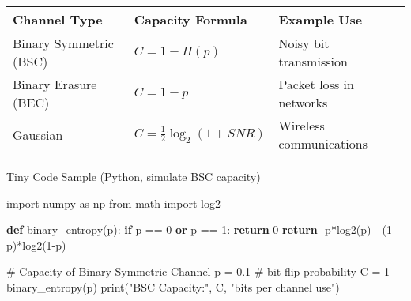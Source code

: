 \documentclass[
  letterpaper,
  DIV=11,
  numbers=noendperiod]{scrreprt}
\newenvironment{Shaded}{\begin{snugshade}}{\end{snugshade}}
\newcommand{\BuiltInTok}[1]{\textcolor[rgb]{0.00,0.23,0.31}{#1}}
\newcommand{\CommentTok}[1]{\textcolor[rgb]{0.37,0.37,0.37}{#1}}
\newcommand{\ControlFlowTok}[1]{\textcolor[rgb]{0.00,0.23,0.31}{\textbf{#1}}}
\newcommand{\DecValTok}[1]{\textcolor[rgb]{0.68,0.00,0.00}{#1}}
\newcommand{\FloatTok}[1]{\textcolor[rgb]{0.68,0.00,0.00}{#1}}
\newcommand{\ImportTok}[1]{\textcolor[rgb]{0.00,0.46,0.62}{#1}}
\newcommand{\KeywordTok}[1]{\textcolor[rgb]{0.00,0.23,0.31}{\textbf{#1}}}
\newcommand{\NormalTok}[1]{\textcolor[rgb]{0.00,0.23,0.31}{#1}}
\newcommand{\OperatorTok}[1]{\textcolor[rgb]{0.37,0.37,0.37}{#1}}
\newcommand{\StringTok}[1]{\textcolor[rgb]{0.13,0.47,0.30}{#1}}
\begin{document}
\begin{longtable}[]{@{}
  >{\raggedright\arraybackslash}p{}
  >{\raggedright\arraybackslash}p{}
  >{\raggedright\arraybackslash}p{}@{}}
\toprule\noalign{}
\begin{minipage}[b]{\linewidth}\raggedright
Channel Type
\end{minipage} & \begin{minipage}[b]{\linewidth}\raggedright
Capacity Formula
\end{minipage} & \begin{minipage}[b]{\linewidth}\raggedright
Example Use
\end{minipage} \\
\midrule\noalign{}
\endhead
\bottomrule\noalign{}
\endlastfoot
Binary Symmetric (BSC) & \(C = 1 - H(p)\) & Noisy bit transmission \\
Binary Erasure (BEC) & \(C = 1 - p\) & Packet loss in networks \\
Gaussian & \(C = \tfrac{1}{2}\log_2(1+SNR)\) & Wireless
communications \\
\end{longtable}

Tiny Code Sample (Python, simulate BSC capacity)

\begin{Shaded}
\begin{Highlighting}[]
\ImportTok{import}\NormalTok{ numpy }\ImportTok{as}\NormalTok{ np}
\ImportTok{from}\NormalTok{ math }\ImportTok{import}\NormalTok{ log2}

\KeywordTok{def}\NormalTok{ binary\_entropy(p):}
    \ControlFlowTok{if}\NormalTok{ p }\OperatorTok{==} \DecValTok{0} \KeywordTok{or}\NormalTok{ p }\OperatorTok{==} \DecValTok{1}\NormalTok{: }\ControlFlowTok{return} \DecValTok{0}
    \ControlFlowTok{return} \OperatorTok{{-}}\NormalTok{p}\OperatorTok{*}\NormalTok{log2(p) }\OperatorTok{{-}}\NormalTok{ (}\DecValTok{1}\OperatorTok{{-}}\NormalTok{p)}\OperatorTok{*}\NormalTok{log2(}\DecValTok{1}\OperatorTok{{-}}\NormalTok{p)}

\CommentTok{\# Capacity of Binary Symmetric Channel}
\NormalTok{p }\OperatorTok{=} \FloatTok{0.1}  \CommentTok{\# bit flip probability}
\NormalTok{C }\OperatorTok{=} \DecValTok{1} \OperatorTok{{-}}\NormalTok{ binary\_entropy(p)}
\BuiltInTok{print}\NormalTok{(}\StringTok{"BSC Capacity:"}\NormalTok{, C, }\StringTok{"bits per channel use"}\NormalTok{)}
\end{Highlighting}
\end{Shaded}
\end{document}
